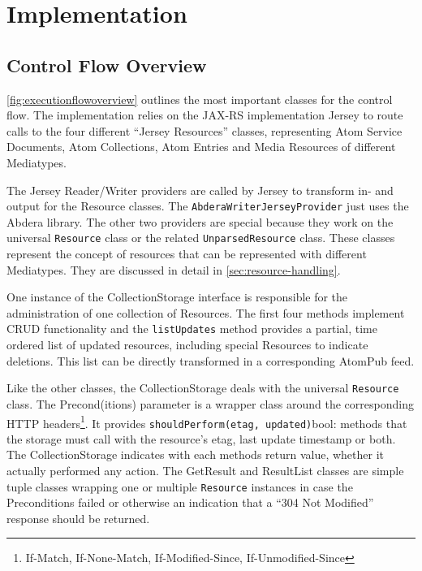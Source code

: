 \documentclass[12pt,a4paper,twoside]{scrartcl}		%
\begin{document}
\section{Implementation}
\label{sec:implementation}


\subsection{Control Flow Overview}
\label{sec:overview}

\autoref{fig:executionflowoverview} outlines the most important classes for the
control flow. The implementation relies on the JAX-RS\cite{JAX-RS1.1}
implementation Jersey to route calls to the four different ``Jersey Resources''
classes, representing Atom Service Documents, Atom Collections, Atom Entries and
Media Resources of different Mediatypes.

The Jersey Reader/Writer providers are called by Jersey to transform in- and
output for the Resource classes. The \lstinline:AbderaWriterJerseyProvider: just
uses the Abdera library. The other two providers are special because they work
on the universal \lstinline:Resource: class or the related
\lstinline:UnparsedResource: class. These classes represent the concept of
resources that can be represented with different Mediatypes. They are discussed
in detail in \autoref{sec:resource-handling}.

One instance of the CollectionStorage interface is responsible for the
administration of one collection of Resources. The first four methods implement
CRUD functionality and the \lstinline:listUpdates: method provides a partial,
time ordered list of updated resources, including special Resources to indicate
deletions. This list can be directly transformed in a corresponding AtomPub
feed.

Like the other classes, the CollectionStorage deals with the universal
\lstinline:Resource: class. The Precond(itions) parameter is a wrapper class
around the corresponding HTTP headers\footnote{If-Match, If-None-Match,
  If-Modified-Since, If-Unmodified-Since}. It provides
\lstinline:shouldPerform(etag, updated):bool: methods that the storage must call
with the resource's etag, last update timestamp or both. The CollectionStorage
indicates with each methods return value, whether it actually performed any
action. The GetResult and ResultList classes are simple tuple classes wrapping
one or multiple \lstinline:Resource: instances in case the Preconditions failed
or otherwise an indication that a ``304 Not Modified'' response should be
returned.
\end{document}
